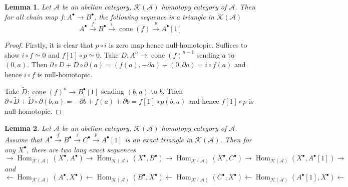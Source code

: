 \documentclass{ctexart}
\newtheorem{lemma}{Lemma}[section]
\renewcommand{\hom}{\operatorname{Hom}}
\newcommand{\cone}{\operatorname{cone}}
\begin{document}
\begin{lemma}
    Let $\mathscr{A}$ be an abelian category, $\mathcal{K}(\mathscr{A})$ homotopy category of $\mathscr{A}$.
    Then for all chain map $f: A^{\bullet} \rightarrow B^{\bullet}$, the following sequence is a triangle in $\mathcal{K}(\mathscr{A})$
    \begin{equation}
        A^{\bullet} \overset{f}{\longrightarrow} B^{\bullet} \overset{i}{\longrightarrow} \cone(f) \overset{p}{\longrightarrow} A^{\bullet}[1]
    \end{equation}
    \label{Lemma 6.2}
\end{lemma}
\vspace{-\baselineskip} %
\vspace{-\baselineskip} %
\begin{proof}
    Firstly, it is clear that $p \circ i$ is zero map hence null-homotopic.
    Suffices to show $i \circ f \simeq 0$ and $f[1] \circ p \simeq 0$.
    Take $D: A^{n} \rightarrow \cone(f)^{n - 1}$ sending $a$ to $(0, a)$.
    Then $\partial \circ D + D \circ \partial(a) = (f(a), -\partial a) + (0, \partial a) = i \circ f(a)$ and hence $i \circ f$ is null-homotopic.
    \par
    Take $\widetilde{D}: \cone(f)^{n} \rightarrow B^{\bullet}[1]$ sending $(b, a)$ to $b$.
    Then $\partial \circ \widetilde{D} + \widetilde{D} \circ \partial(b, a) = - \partial b + f(a) + \partial b = f[1] \circ p(b, a)$ and hence $f[1] \circ p$ is null-homotopic.
\end{proof}
\begin{lemma}
    Let $\mathscr{A}$ be an abelian category, $\mathcal{K}(\mathscr{A})$ homotopy category of $\mathscr{A}$.
    Assume that $A^{\bullet} \overset{f}{\rightarrow} B^{\bullet} \overset{i}{\rightarrow} C^{\bullet} \overset{p}{\rightarrow} A^{\bullet}[1]$ is an exact triangle in $\mathcal{K}(\mathscr{A})$.
    Then for any $X^{\bullet}$, there are two long exact sequences
    \begin{equation*}
        \rightarrow \hom_{\mathcal{K}(\mathscr{A})}(X^{\bullet}, A^{\bullet}) \rightarrow \hom_{\mathcal{K}(\mathscr{A})}(X^{\bullet}, B^{\bullet}) \rightarrow \hom_{\mathcal{K}(\mathscr{A})}(X^{\bullet}, C^{\bullet}) \rightarrow \hom_{\mathcal{K}(\mathscr{A})}(X^{\bullet}, A^{\bullet}[1]) \rightarrow
    \end{equation*}
    and
    \begin{equation*}
        \leftarrow \hom_{\mathcal{K}(\mathscr{A})}(A^{\bullet}, X^{\bullet}) \leftarrow \hom_{\mathcal{K}(\mathscr{A})}(B^{\bullet}, X^{\bullet}) \leftarrow \hom_{\mathcal{K}(\mathscr{A})}(C^{\bullet}, X^{\bullet}) \leftarrow \hom_{\mathcal{K}(\mathscr{A})}(A^{\bullet}[1], X^{\bullet}) \leftarrow
    \end{equation*}
    \label{Lemma 6.3}
\end{lemma}
\end{document}
